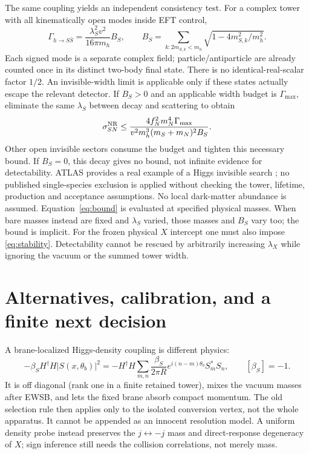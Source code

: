 \documentclass[11pt,a4paper]{article}
\begin{document}
The same coupling yields an independent consistency test. For a complex
tower with all kinematically open modes inside EFT control,
\begin{equation}
 \Gamma_{h\to S\bar S}=\frac{\lambda_S^2v^2}{16\pi m_h}
 B_S,\qquad B_S=\sum_{k:2m_{S,k}<m_h}
 \sqrt{1-4m_{S,k}^2/m_h^2}.
\end{equation}
Each signed mode is a separate complex field; particle/antiparticle
are already counted once in its distinct two-body final state. There
is no identical-real-scalar factor $1/2$. An invisible-width limit is
applicable only if these states actually escape the relevant detector.
If $B_S>0$ and an applicable width budget is $\Gamma_{\max}$, eliminate
the same $\lambda_S$ between decay and scattering to obtain
\begin{equation}\label{eq:bound}
 \sigma_{SN}^{\rm NR}\leq
 \frac{4 f_N^2m_N^4\Gamma_{\max}}
 {v^2m_h^3(m_S+m_N)^2B_S}.
\end{equation}
Other open invisible sectors consume the budget and tighten this
necessary bound. If $B_S=0$, this decay gives no bound, not infinite
evidence for detectability. ATLAS provides a real example of a Higgs
invisible search \cite{atlas}; no published single-species exclusion
is applied without checking the tower, lifetime, production and
acceptance assumptions. No local dark-matter abundance is assumed.
Equation~\eqref{eq:bound} is evaluated at specified physical masses.
When bare masses instead are fixed and $\lambda_S$ varied, those masses
and $B_S$ vary too; the bound is implicit. For the frozen physical
$X$ intercept one must also impose \eqref{eq:stability}. Detectability
cannot be rescued by arbitrarily increasing $\lambda_X$ while ignoring
the vacuum or the summed tower width.

\section{Alternatives, calibration, and a finite next decision}
A brane-localized Higgs-density coupling is different physics:
\begin{equation}
 -\beta_S H^\dagger H |S(x,\theta_b)|^2
 =-H^\dagger H\sum_{m,n}\frac{\beta_S}{2\pi R}
 e^{i(n-m)\theta_b}S_m^*S_n,\qquad [\beta_S]=-1.
\end{equation}
It is off diagonal (rank one in a finite retained tower), mixes the
vacuum masses after EWSB, and lets the fixed brane absorb compact
momentum. The old selection rule then applies only to the isolated
conversion vertex, not the whole apparatus. It cannot be appended as
an innocent resolution model. A uniform density probe instead preserves
the $j\leftrightarrow-j$ mass and direct-response degeneracy of $X$;
sign inference still needs the collision correlations, not merely mass.
\end{document}
